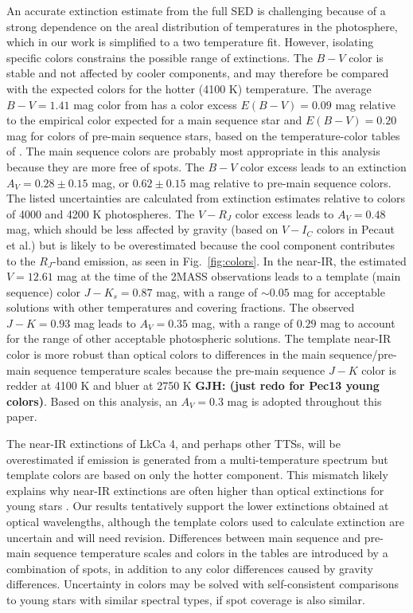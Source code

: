 \documentclass[twocolumn]{emulateapj}%
\begin{document}
An accurate extinction estimate from the full SED is challenging because of a strong dependence on the areal distribution of temperatures in the photosphere, which in our work is simplified to a two temperature fit.  However, isolating specific colors constrains the possible range of extinctions.  
The $B-V$ color is stable and not affected by cooler components, and may therefore be compared with the expected colors for the hotter (4100 K) temperature.  
The average $B-V=1.41$ mag color from \citet{grankin08} has a color excess $E(B-V)=0.09$ mag relative to the empirical color expected for a main sequence star and $E(B-V)=0.20$ mag for colors of pre-main sequence stars, based on the temperature-color tables of \citep{pecaut13}.  The main sequence colors are probably most 
appropriate in this analysis because they are more free of spots.  
The $B-V$ color 
excess leads to an extinction $A_V=0.28\pm0.15$ mag, or $0.62\pm0.15$ mag relative to 
pre-main sequence colors.   The listed uncertainties are calculated from extinction estimates relative to colors of 4000 and 4200 K photospheres.
The $V-R_J$ color excess leads to $A_V=0.48$ mag, which should be less affected by gravity (based on $V-I_C$ colors in Pecaut et al.) but is likely to be overestimated because the cool component contributes to the $R_J$-band emission, as seen in Fig.~\ref{fig:colors}.
In the near-IR, the estimated $V=12.61$ mag at the time of the 2MASS observations leads to a template (main sequence) color 
$J-K_s=0.87$ mag, with a range of $\sim 0.05$ mag for acceptable solutions with other 
temperatures and covering fractions. The observed $J-K=0.93$ mag leads to $A_V=0.35$ mag, 
with a range of $0.29$ mag to account for the range of other acceptable photospheric solutions.  
The template near-IR color is more robust than optical colors to differences 
in the main sequence/pre-main sequence temperature scales because the pre-main 
sequence $J-K$ color is redder at 4100 K and bluer at 2750 K {\bf GJH: (just redo for Pec13 young colors)}.  Based on this 
analysis, an $A_V=0.3$ mag is adopted throughout this paper. 

The near-IR extinctions of LkCa 4, and perhaps other TTSs, will be overestimated if emission is generated from a multi-temperature spectrum but template colors are based on only the hotter component.  This mismatch likely explains why near-IR extinctions are often higher than optical extinctions for young stars \citep[see analysis in][]{herczeg14}.  Our results tentatively support the lower extinctions obtained at optical wavelengths, although the template colors used to calculate extinction are uncertain and will need revision.  Differences between main sequence and pre-main sequence temperature scales and colors in the \citet{pecaut13} tables are introduced by a combination of spots, in addition to any color differences caused by gravity differences.
Uncertainty in colors may be solved with self-consistent comparisons to young stars with similar spectral types, if spot coverage is also similar.
\end{document}
